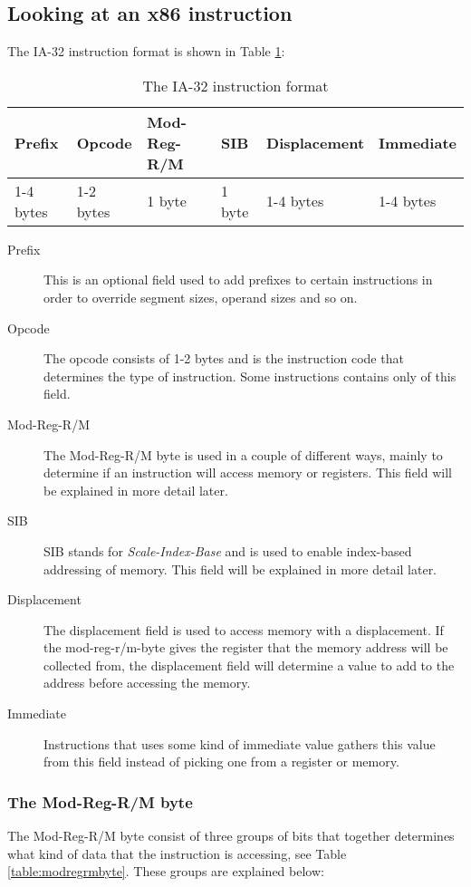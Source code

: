 \documentclass[11pt,twoside]{eitExjobb}
\begin{document}
\subsection{Looking at an x86 instruction}
The IA-32 instruction format is shown in Table \ref{table:ia32instructionformat}: \\

\begin{table}[h]
\begin{tabular}{|l|l|l|l|l|l|}
\hline
Prefix & Opcode & Mod-Reg-R/M & SIB & Displacement & Immediate \\ \hline
1-4 bytes & 1-2 bytes & 1 byte & 1 byte & 1-4 bytes & 1-4 bytes \\
\hline
\end{tabular}
\caption{The IA-32 instruction format}
\label{table:ia32instructionformat}
\end{table}

\begin{description}
\item[Prefix] This is an optional field used to add prefixes to certain instructions in order to override segment sizes, operand sizes and so on.
\item[Opcode] The opcode consists of 1-2 bytes and is the instruction code that determines the type of instruction. Some instructions contains only of this field.
\item[Mod-Reg-R/M] The Mod-Reg-R/M byte is used in a couple of different ways, mainly to determine if an instruction will access memory or registers. This field will be explained in more detail later.  
\item[SIB] SIB stands for \emph{Scale-Index-Base} and is used to enable index-based addressing of memory. This field will be explained in more detail later.
\item[Displacement] The displacement field is used to access memory with a displacement. If the mod-reg-r/m-byte gives the register that the memory address will be collected from, the displacement field will determine a value to add to the address before accessing the memory.
\item[Immediate] Instructions that uses some kind of immediate value gathers this value from this field instead of picking one from a register or memory.
\end{description}

\subsubsection{The Mod-Reg-R/M byte}
The Mod-Reg-R/M byte consist of three groups of bits that together determines what kind of data that the instruction is accessing, see Table \ref{table:modregrmbyte}. These groups are explained below:\\
\end{document}
